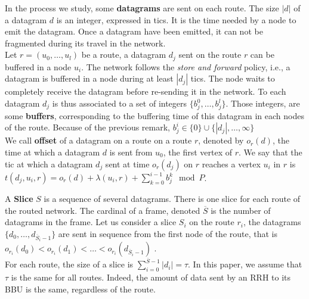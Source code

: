 \documentclass[10pt]{article}
\begin{document}
        In the process we study, some {\bf datagrams} are sent on each route. The size $|d|$ of a datagram $d$ is an integer, expressed in tics. It is the time needed by a node to emit the datagram. Once a datagram have been emitted, it can not be fragmented during its travel in the network. \\
          Let $r=(u_0,\dots,u_l)$ be a route, a datagram $d_j$ sent on the route $r$ can be buffered in a node $u_i$. The network follows the {\em store and forward} policy, i.e., a datagram is buffered in a node during at least $|d_j|$ tics. The node waits to completely receive the datagram before re-sending it in the network. To each datagram $d_j$ is thus associated to a set of integers $\{b_j^0,\ldots,b_j^l\}$. Those integers, are some \textbf{buffers}, corresponding to the buffering time of this datagram in each nodes of the route. Because of the previous remark, $b_j^i \in \{0\} \cup \{|d_j|, \ldots,\infty\}$\\
          We call \textbf{offset} of a datagram on a route on a route $r$, denoted by $o_r(d)$, the time at which a datagram $d$ is sent from $u_0$, the first vertex of $r$. We say that the tic at which a datagram $d_j$ sent at time $o_r(d_j)$ on $r$ reaches a vertex $u_i$ in $r$ is $t(d_j,u_i,r) = o_r(d) + \lambda(u_i,r) + \sum_{k=0}^{i-1}b_j^k \mod P$.
   
        A {\bf Slice} $S$ is a sequence of several datagrams. There is one slice for each route of the routed network. The cardinal of a frame, denoted $\overline S$ is the number of datagrams in the frame. Let us consider a slice $S_i$ on the route $r_i$, the datagrams $\{d_0,\ldots,d_{\overline S_i-1}\}$ are sent in sequence from the first node of the route, that is $o_{r_i}(d_0) < o_{r_i}(d_1) < \ldots < o_{r_i}(d_{\overline S_i-1})$ . \\
       For each route, the size of a slice is $\sum_{i=0}^{{\overline S-1}} |d_i| = \tau$. In this paper, we assume that $\tau$ is the same for all routes. Indeed, the amount of data sent by an RRH to its BBU is the same, regardless of the route.
        
       
      
\end{document}
